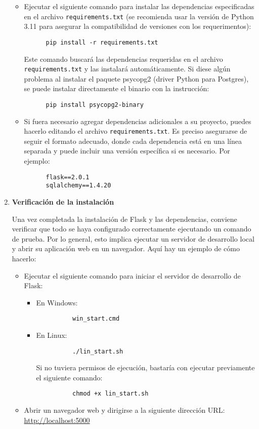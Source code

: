 \begin{enumerate}
   \begin{itemize}
    \item Ejecutar el siguiente comando para instalar las dependencias especificadas en el archivo \texttt{requirements.txt} (se recomienda usar la versión de Python 3.11 para asegurar la compatibilidad de versiones con los requerimentos):
      \begin{verbatim}
      pip install -r requirements.txt
      \end{verbatim}
      Este comando buscará las dependencias requeridas en el archivo \texttt{requirements.txt} y las instalará automáticamente.  Si diese algún problema al instalar el paquete psycopg2 (driver Python para Postgres), se puede instalar directamente el binario con la instrucción: 
      \begin{verbatim}
      pip install psycopg2-binary
      \end{verbatim}
    \item Si fuera necesario agregar dependencias adicionales a su proyecto, puedes hacerlo editando el archivo \texttt{requirements.txt}. Es preciso asegurarse de seguir el formato adecuado, donde cada dependencia está en una línea separada y puede incluir una versión específica si es necesario. Por ejemplo:
      \begin{verbatim}
      flask==2.0.1
      sqlalchemy==1.4.20
      \end{verbatim}
  \end{itemize}


\item \textbf{Verificación de la instalación}
\label{Verificación de la instalación}

   Una vez completada la instalación de Flask y las dependencias, conviene verificar que todo se haya configurado correctamente ejecutando un comando de prueba. Por lo general, esto implica ejecutar un servidor de desarrollo local y abrir su aplicación web en un navegador. Aquí hay un ejemplo de cómo hacerlo:

 \begin{itemize}
    \item Ejecutar el siguiente comando para iniciar el servidor de desarrollo de Flask:
      \begin{itemize}
        \item En Windows:
          \begin{verbatim}
          win_start.cmd
          \end{verbatim}
        \item En Linux:
          \begin{verbatim}
          ./lin_start.sh
          \end{verbatim}
          Si no tuviera permisos de ejecución, bastaría con ejecutar previamente el siguiente comando:
          \begin{verbatim}
          chmod +x lin_start.sh
          \end{verbatim}
      \end{itemize}
    \item Abrir un navegador web y dirigirse a la siguiente dirección URL: \url{http://localhost:5000}
  \end{itemize}


\end{enumerate}

